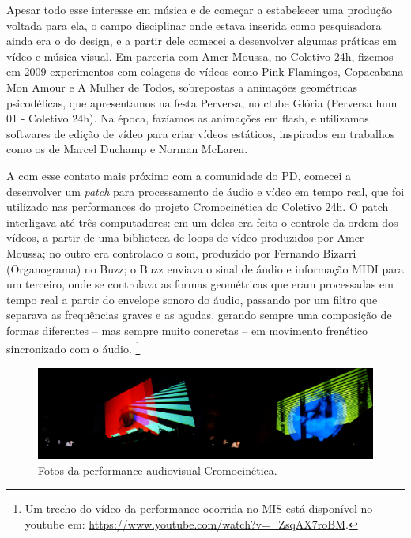 Apesar todo esse interesse em música e de começar a estabelecer uma produção voltada para ela, o campo disciplinar onde estava inserida como pesquisadora ainda era o do design, e a partir dele comecei a desenvolver algumas práticas em vídeo e música visual. Em parceria com Amer Moussa, no Coletivo 24h, fizemos em 2009 experimentos com colagens de vídeos como Pink Flamingos, Copacabana Mon Amour e A Mulher de Todos, sobrepostas a animações geométricas psicodélicas, que apresentamos na festa Perversa, no clube Glória (Perversa hum 01 - Coletivo 24h). Na época, fazíamos as animações em flash, e utilizamos softwares de edição de vídeo para criar vídeos estáticos, inspirados em trabalhos como os de Marcel Duchamp e Norman McLaren. 

A com esse contato mais próximo com a comunidade do PD, comecei a desenvolver um \emph{patch} para processamento de áudio e vídeo em tempo real, que foi utilizado nas performances do projeto Cromocinética do Coletivo 24h. O patch interligava até três computadores: em um deles era feito o controle da ordem dos vídeos, a partir de uma biblioteca de loops de vídeo produzidos por Amer Moussa; no outro era controlado o som, produzido por Fernando Bizarri (Organograma) no Buzz; o Buzz enviava o sinal de áudio e informação MIDI para um terceiro, onde se controlava as formas geométricas que eram processadas em tempo real a partir do envelope sonoro do áudio, passando por um filtro que separava as frequências graves e as agudas, gerando sempre uma composição de formas diferentes – mas sempre muito concretas – em movimento frenético sincronizado com o áudio. \footnote{Um trecho do vídeo da performance ocorrida no MIS está disponível no youtube em:  \url{https://www.youtube.com/watch?v=_ZsqAX7roBM}.}

\begin{figure}

\includegraphics[width=1\textwidth]{pictures/cap1/cromocinetica}
\caption{Fotos da performance audiovisual Cromocinética.}
\label{fig:cromocinetica}
\end{figure}

